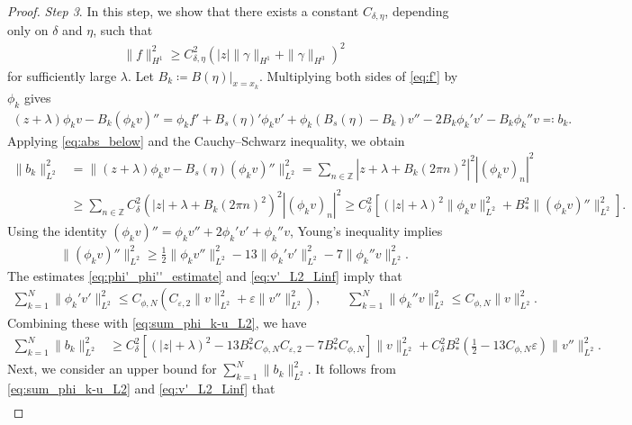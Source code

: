 \documentclass{article}
\theoremstyle{remark}
\theoremstyle{definition}
\numberwithin{equation}{section}
\begin{document}
\begin{proof}
\textit{Step 3}.
In this step, we show that there exists a constant $C_{\delta,\eta}$, depending only on $\delta$ and $\eta$, such that
\begin{align*}
    \|f\|_{H^1}^2 \ge C_{\delta,\eta}^2\left(|z|\|\gamma\|_{H^1} + \|\gamma\|_{H^3}\right)^2
\end{align*}
for sufficiently large $\lambda$.
Let $B_k\coloneqq B(\eta)|_{x=x_k}$.
Multiplying both sides of \eqref{eq:f'} by $\phi_k$ gives
\begin{align*}
    (z+\lambda)\phi_kv - B_k(\phi_kv)''
    =\phi_kf'+B_s(\eta)'\phi_kv'+\phi_k(B_s(\eta)-B_k)v''-2B_k\phi_k'v'-B_k\phi_k''v
    \eqqcolon b_k.
\end{align*}
Applying \eqref{eq:abs_below} and the Cauchy--Schwarz inequality, we obtain
\begin{align*}
    \|b_k\|_{L^2}^2
    &= \|(z+\lambda)\phi_kv - B_s(\eta)(\phi_kv)''\|_{L^2}^2
    =\sum_{n\in\mathbb{Z}}|z+\lambda+B_k(2\pi n)^2|^2|(\phi_kv)_n|^2\\
    &\ge\sum_{n\in\mathbb{Z}}C_\delta^2(|z|+\lambda+B_k(2\pi n)^2)^2|(\phi_kv)_n|^2
    \ge C_\delta^2\left[(|z|+\lambda)^2\|\phi_kv\|_{L^2}^2 + B_\ast^2\|(\phi_kv)''\|_{L^2}^2\right].
\end{align*}
Using the identity $(\phi_kv)'' = \phi_kv''+2\phi_k'v'+\phi_k''v$, Young's inequality implies
\begin{align*}
    \|(\phi_kv)''\|_{L^2}^2
    \ge\frac{1}{2}\|\phi_kv''\|_{L^2}^2 - 13\|\phi_k'v'\|_{L^2}^2 - 7\|\phi_k''v\|_{L^2}^2.
\end{align*}
The estimates \eqref{eq:phi'_phi''_estimate} and \eqref{eq:v'_L2_Linf} imply that
\begin{align*}
    \sum_{k=1}^N\|\phi_k'v'\|_{L^2}^2
    \le C_{\phi,N}\left(C_{\varepsilon,2}\|v\|_{L^2}^2 + \varepsilon\|v''\|_{L^2}^2\right),\qquad
    \sum_{k=1}^N\|\phi_k''v\|_{L^2}^2 \le C_{\phi,N}\|v\|_{L^2}^2.
\end{align*}
Combining these with \eqref{eq:sum_phi_k-u_L2}, we have
\begin{align}
    \sum_{k=1}^N\|b_k\|_{L^2}^2
    &\ge
    C_\delta^2\left[(|z|+\lambda)^2 - 13B_\ast^2C_{\phi,N}C_{\varepsilon,2} - 7B_\ast^2C_{\phi,N}\right]\|v\|_{L^2}^2 + C_\delta^2B_\ast^2\left(\frac{1}{2}-13C_{\phi,N}\varepsilon\right)\|v''\|_{L^2}^2.
    \label{eq:sum_bk_lower}
\end{align}
Next, we consider an upper bound for $\sum_{k=1}^N\|b_k\|_{L^2}^2$.
It follows from \eqref{eq:sum_phi_k-u_L2} and \eqref{eq:v'_L2_Linf} that
\begin{align*}

\end{align*}
\end{proof}
\end{document}
